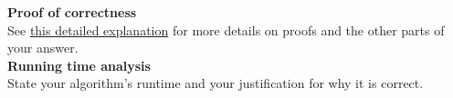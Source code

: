 \documentclass[11pt]{article}
\begin{document}
\vspace{0.2in}

\noindent
\textbf{Proof of correctness}\\

See \href{http://www-inst.eecs.berkeley.edu/~cs170/fa14/hws/instruct.pdf}{this detailed explanation} for more details on proofs and the other parts of your answer.\\

\noindent
\textbf{Running time analysis}\\

State your algorithm's runtime and your justification for why it is correct.
\end{document}
